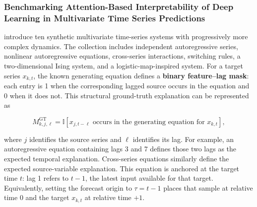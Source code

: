 \subsubsection{Benchmarking Attention-Based Interpretability of Deep Learning in Multivariate Time Series Predictions}

\citet{baric2021benchmarking} introduce ten synthetic multivariate time-series
systems with progressively more complex dynamics. The collection includes
independent autoregressive series, nonlinear autoregressive equations,
cross-series interactions, switching rules, a two-dimensional Ising system, and
a logistic-map-inspired system. For a target series $x_{k,t}$, the known
generating equation defines a \textbf{binary feature--lag mask}: each entry is
1 when the corresponding lagged source occurs in the equation and 0 when it
does not. This structural ground-truth explanation can be represented as

\begin{equation}
    M^{\mathrm{GT}}_{k,j,\ell}
    =
    \mathbb{I}\!\left[
        x_{j,t-\ell}\text{ occurs in the generating equation for }x_{k,t}
    \right],
\end{equation}

where $j$ identifies the source series and $\ell$ identifies its lag. For
example, an autoregressive equation containing lags 3 and 7 defines those two
lags as the expected temporal explanation. Cross-series equations similarly
define the expected source-variable explanation. This equation is anchored at
the target time $t$: lag 1 refers to $t-1$, the latest input available for that
target. Equivalently, setting the forecast origin to $\tau=t-1$ places that
sample at relative time 0 and the target $x_{k,t}$ at relative time $+1$.

